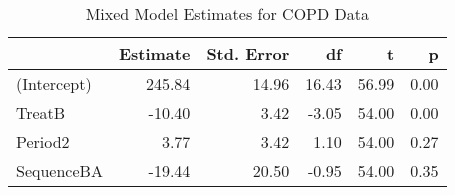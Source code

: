 \begin{table}

\caption{Mixed Model Estimates for COPD Data}
\centering
\begin{tabular}[t]{>{}l|rrrrr}
\toprule
 & Estimate & Std. Error & df & t & p\\
\midrule
(Intercept) & 245.84 & 14.96 & 16.43 & 56.99 & 0.00\\
TreatB & -10.40 & 3.42 & -3.05 & 54.00 & 0.00\\
Period2 & 3.77 & 3.42 & 1.10 & 54.00 & 0.27\\
SequenceBA & -19.44 & 20.50 & -0.95 & 54.00 & 0.35\\
\bottomrule
\end{tabular}
\end{table}
